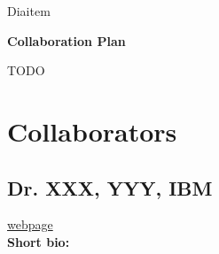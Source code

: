 Diaitem \documentclass[10pt]{SelfArx}
\begin{document}
\pagestyle{plain}

\begin{center}
{\color{color1} \bf \large
Collaboration Plan}
\end{center}
 
TODO 
 
 
\section*{Collaborators}
   
\subsection*{Dr. XXX, YYY, IBM} 
\url{webpage}\\
{\bf Short bio:}
 
\end{document}
